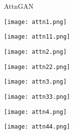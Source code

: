 \documentclass{article}
\begin{document}
\begin{figure}[t]
\begin{minipage}{0.12\textwidth}\raggedright
\scriptsize{AttnGAN \cite{xu2018attngan}}\\
\end{minipage}
\quad\begin{minipage}{0.10\textwidth}
\texttt{[image: attn1.png]}
\end{minipage}
\noindent\begin{minipage}{0.10\textwidth}
\texttt{[image: attn11.png]}
\end{minipage}
\noindent\begin{minipage}{0.10\textwidth}
\texttt{[image: attn2.png]}
\end{minipage}
\noindent\begin{minipage}{0.10\textwidth}
\texttt{[image: attn22.png]}
\end{minipage}
\noindent\begin{minipage}{0.10\textwidth}
\texttt{[image: attn3.png]}
\end{minipage}
\noindent\begin{minipage}{0.10\textwidth}
\texttt{[image: attn33.png]}
\end{minipage}
\noindent\begin{minipage}{0.10\textwidth}
\texttt{[image: attn4.png]}
\end{minipage}
\noindent\begin{minipage}{0.10\textwidth}
\texttt{[image: attn44.png]}
\end{minipage}
\hfill 


\end{figure}
\end{document}

